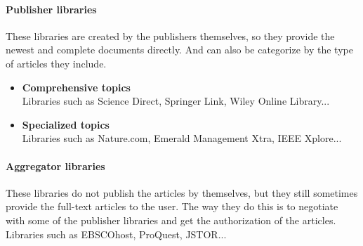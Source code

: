 \paragraph{Publisher libraries}
	These libraries are created by the publishers themselves, so they provide the newest and complete documents directly. And can also be categorize by the type of articles they include.
	\begin{itemize}
		\item\textbf{Comprehensive topics}\\Libraries such as Science Direct, Springer Link, Wiley Online Library...
		\item\textbf{Specialized topics}\\Libraries such as Nature.com, Emerald Management Xtra, IEEE Xplore...
	\end{itemize}
	
\paragraph{Aggregator libraries}
	These libraries do not publish the articles by themselves, but they still sometimes provide the full-text articles to the user. The way they do this is to negotiate with some of the publisher libraries and get the authorization of the articles. Libraries such as EBSCOhost, ProQuest, JSTOR...


